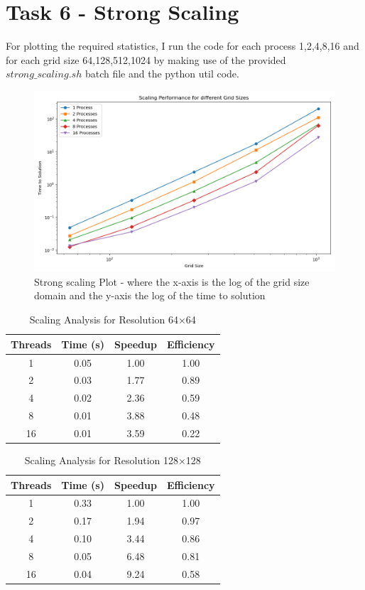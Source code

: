 \documentclass[unicode,11pt,a4paper,oneside,numbers=endperiod,openany]{scrartcl}
\begin{document}
\section{Task 6 - Strong Scaling}

For plotting the required statistics, I run the code for each process {1,2,4,8,16} and for each grid size {64,128,512,1024} by making use 
of the provided $strong\_scaling.sh$ batch file and the python util code. 

\begin{figure}[H]
  \centering
  \includegraphics[width=\textwidth]{../code/mini_app/strongscaling/strong_scaling.png}
  \caption{Strong scaling Plot - where the x-axis is the log of the grid size domain and the y-axis the log of the time to solution}
\end{figure}



\FloatBarrier  %
\begin{table}[!h]
\centering
\caption{Scaling Analysis for Resolution 64×64}
\begin{tabular}{cccc}
\hline
Threads & Time (s) & Speedup & Efficiency \\
\hline
1 & 0.05 & 1.00 & 1.00 \\
2 & 0.03 & 1.77 & 0.89 \\
4 & 0.02 & 2.36 & 0.59 \\
8 & 0.01 & 3.88 & 0.48 \\
16 & 0.01 & 3.59 & 0.22 \\
\hline
\end{tabular}
\end{table}
\FloatBarrier

\begin{table}[!h]
\centering
\caption{Scaling Analysis for Resolution 128×128}
\begin{tabular}{cccc}
\hline
Threads & Time (s) & Speedup & Efficiency \\
\hline
1 & 0.33 & 1.00 & 1.00 \\
2 & 0.17 & 1.94 & 0.97 \\
4 & 0.10 & 3.44 & 0.86 \\
8 & 0.05 & 6.48 & 0.81 \\
16 & 0.04 & 9.24 & 0.58 \\
\hline
\end{tabular}
\end{table}
\FloatBarrier
\end{document}
